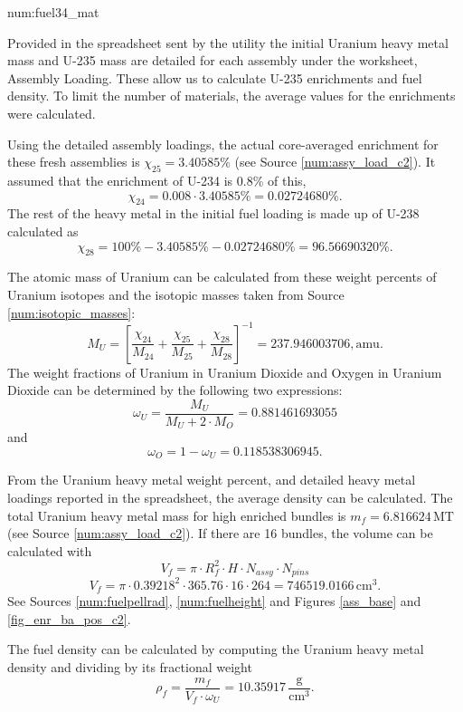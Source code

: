 \begin{numitem}{num:fuel34_mat}
  
   Provided in the spreadsheet sent by the utility the initial Uranium heavy metal mass and U-235 mass are detailed for each assembly under the worksheet, Assembly Loading. These allow us to calculate U-235 enrichments and fuel density. To limit the number of materials, the average values for the enrichments were calculated. 
   
   Using the detailed assembly loadings, the actual core-averaged enrichment for these fresh assemblies is $\chi_{25} = 3.40585\%$ (see Source \ref{num:assy_load_c2}). It assumed that the enrichment of U-234 is 0.8\% of this,
\[
    \chi_{24} = 0.008\cdot 3.40585\% = 0.02724680\%.
\]
    The rest of the heavy metal in the initial fuel loading is made up of U-238 calculated as
\[
    \chi_{28} = 100\% - 3.40585\% - 0.02724680\% = 96.56690320\%.
\]

The atomic mass of Uranium can be calculated from these weight percents of Uranium isotopes and the isotopic masses taken from Source \ref{num:isotopic_masses}:
\[
    M_U = \left[ \frac{\chi_{24}}{M_{24}} + \frac{\chi_{25}}{M_{25}} + \frac{\chi_{28}}{M_{28}} \right ]^{-1} = 237.946003706,\mathrm{amu}. 
\]
The weight fractions of Uranium in Uranium Dioxide and Oxygen in Uranium Dioxide can be determined by the following two expressions:
\[
    \omega_{U} = \frac{M_U}{M_U + 2\cdot M_O} = 0.881461693055
\]
and
\[
    \omega_{O} = 1 - \omega_{U} = 0.118538306945. 
\]

From the Uranium heavy metal weight percent, and detailed heavy metal loadings reported in the spreadsheet, the average density can be calculated. The total Uranium heavy metal mass for high enriched bundles is $m_f = 6.816624\,\mathrm{MT}$ (see Source \ref{num:assy_load_c2}).  If there are 16 bundles, the volume can be calculated with
\[
    V_f = \pi \cdot R_f^2 \cdot H \cdot N_{assy} \cdot N_{pins}
\]
\[
    V_f = \pi \cdot 0.39218^2 \cdot 365.76 \cdot 16 \cdot 264 = 746519.0166\,\mathrm{cm^3}.
\]
See Sources \ref{num:fuelpellrad}, \ref{num:fuelheight} and Figures \ref{ass_base} and \ref{fig_enr_ba_pos_c2}.

The fuel density can be calculated by computing the Uranium heavy metal density and dividing by its fractional weight
\[
    \rho_f = \frac{m_f}{V_f\cdot\omega_{U}} = 10.35917\,\mathrm{\frac{g}{cm^3}}.
\]


\end{numitem}
